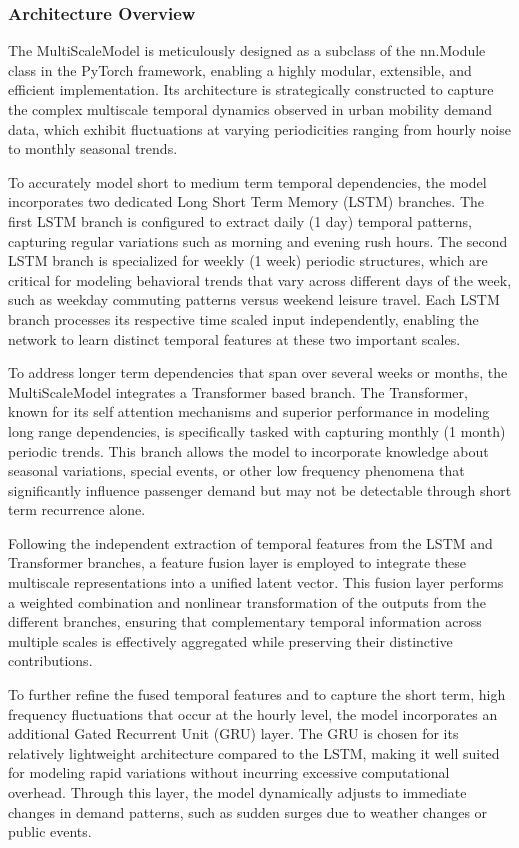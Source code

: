 \documentclass{article}
\begin{document}
\subsubsection{Architecture Overview}

The MultiScaleModel is meticulously designed as a subclass of the nn.Module class in the PyTorch framework, enabling a highly modular, extensible, and efficient implementation. Its architecture is strategically constructed to capture the complex multiscale temporal dynamics observed in urban mobility demand data, which exhibit fluctuations at varying periodicities ranging from hourly noise to monthly seasonal trends.

To accurately model short to medium term temporal dependencies, the model incorporates two dedicated Long Short Term Memory (LSTM) branches. The first LSTM branch is configured to extract daily (1 day) temporal patterns, capturing regular variations such as morning and evening rush hours. The second LSTM branch is specialized for weekly (1 week) periodic structures, which are critical for modeling behavioral trends that vary across different days of the week, such as weekday commuting patterns versus weekend leisure travel. Each LSTM branch processes its respective time scaled input independently, enabling the network to learn distinct temporal features at these two important scales.

To address longer term dependencies that span over several weeks or months, the MultiScaleModel integrates a Transformer based branch. The Transformer, known for its self attention mechanisms and superior performance in modeling long range dependencies, is specifically tasked with capturing monthly (1 month) periodic trends. This branch allows the model to incorporate knowledge about seasonal variations, special events, or other low frequency phenomena that significantly influence passenger demand but may not be detectable through short term recurrence alone.

Following the independent extraction of temporal features from the LSTM and Transformer branches, a feature fusion layer is employed to integrate these multiscale representations into a unified latent vector. This fusion layer performs a weighted combination and nonlinear transformation of the outputs from the different branches, ensuring that complementary temporal information across multiple scales is effectively aggregated while preserving their distinctive contributions.

To further refine the fused temporal features and to capture the short term, high frequency fluctuations that occur at the hourly level, the model incorporates an additional Gated Recurrent Unit (GRU) layer. The GRU is chosen for its relatively lightweight architecture compared to the LSTM, making it well suited for modeling rapid variations without incurring excessive computational overhead. Through this layer, the model dynamically adjusts to immediate changes in demand patterns, such as sudden surges due to weather changes or public events.
\end{document}
